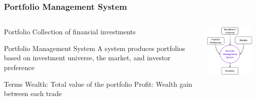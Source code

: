 \begin{frame}
\frametitle{Portfolio Management System}
\begin{columns}
\begin{column}{0.55\textwidth}
\begin{block}{Portfolio}
Collection of financial investments
\end{block}
\begin{block}{Portfolio Management System}
A system produces portfolios based on investment universe, the market, and investor preference
\end{block}
\begin{block}{Terms}
    Wealth: Total value of the portfolio
    Profit: Wealth gain between each trade
\end{block}
\end{column}

\begin{column}{0.45\textwidth}
\begin{center}
\includegraphics[width=4.8cm]{images/portfolio_management_system.png}
\end{center}
\end{column}
\end{columns}
\end{frame}



